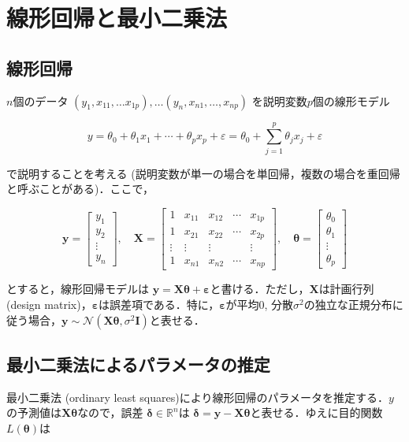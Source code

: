 \section{線形回帰と最小二乗法}
\subsection{線形回帰}
$n$個のデータ $\left(y_1,x_{11}, \ldots x_{1p}\right),\ldots \left(y_n,x_{n1},\ldots, x_{np}\right)$ を説明変数$p$個の線形モデル 


\begin{equation}
y=\theta_0+\theta_1x_1+\cdots+\theta_px_p+\varepsilon=\theta_0+\sum_{j=1}^p \theta_jx_j+\varepsilon
\end{equation}


で説明することを考える (説明変数が単一の場合を単回帰，複数の場合を重回帰と呼ぶことがある)．ここで， 


\begin{equation}
\mathbf{y}= \left[ \begin{array}{c} y_1\\ y_2\\ \vdots \\ y_n \end{array} \right],\quad 
\mathbf{X}=\left[ \begin{array}{ccccc} 1 & x_{11}& x_{12} &\cdots & x_{1p} \\ 1& x_{21}& x_{22}&\cdots & x_{2p}\\ \vdots & \vdots& \vdots& & \vdots \\1 &x_{n1} & x_{n2} &\cdots & x_{np} \end{array} \right],\quad
\mathbf{\theta}= \left[ \begin{array}{c} \theta_0\\ \theta_1\\ \vdots \\ \theta_p \end{array} \right]
\end{equation}


とすると，線形回帰モデルは $\mathbf{y}=\mathbf{X}\mathbf{\theta}+\mathbf{\varepsilon}$と書ける．ただし，$\mathbf{X}$は計画行列 (design matrix)，$\mathbf{\varepsilon}$は誤差項である．特に，$\mathbf{\varepsilon}$が平均0, 分散$\sigma^2$の独立な正規分布に従う場合，$\mathbf{y}\sim \mathcal{N}(\mathbf{X}\mathbf{\theta}, \sigma^2\mathbf{I})$と表せる．
\subsection{最小二乗法によるパラメータの推定}
最小二乗法 (ordinary least squares)により線形回帰のパラメータを推定する．$y$の予測値は$\mathbf{X} \mathbf{\theta}$なので，誤差 $\mathbf{\delta} \in \mathbb{R}^n$は
$\mathbf{\delta} = \mathbf{y}-\mathbf{X} \mathbf{\theta}$と表せる．ゆえに目的関数$L(\mathbf{\theta})$は 


